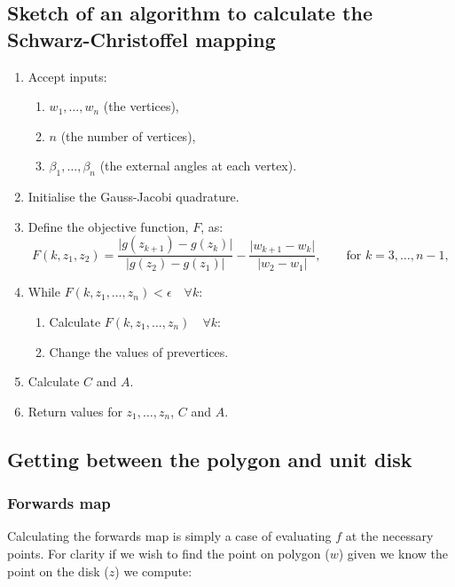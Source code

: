 \documentclass[a4paper,10pt]{amsart}
\newcommand{\sch}{Schwarz-Christoffel }
\begin{document}
\subsection{Sketch of an algorithm to calculate the \sch mapping}

\begin{enumerate}
\item Accept inputs:
   \begin{enumerate} 
      \item $w_1,\dots,w_n$ (the vertices),
      \item $n$ (the number of vertices),
      \item $\beta_1,\dots,\beta_n$ (the external angles at each vertex).
   \end{enumerate}
\item Initialise the Gauss-Jacobi quadrature.
\item Define the objective function, $F$, as:
 \begin{equation*}
 F(k,z_1,z_2) = \frac{\vert g(z_{k+1}) -  g(z_k) \vert}{\vert g(z_2)-g(z_1)\vert} - \frac{\vert w_{k+1} - w_k\vert}{\vert w_2 - w_1\vert}, \qquad \text{for } k=3,\dots,n-1,
 \end{equation*}
\item While $F(k,z_1,\dots,z_n) < \epsilon \quad \forall k$:
\begin{enumerate}
  \item Calculate $F(k,z_1,\dots,z_n) \quad \forall k$:
  \item Change the values of prevertices.
\end{enumerate}
\item Calculate $C$ and $A$.
\item Return values for $z_1,\dots,z_n$, $C$ and $A$.
\end{enumerate}



\subsection{Getting between the polygon and unit disk}

\subsubsection{Forwards map}

Calculating the forwards map is simply a case of evaluating $f$ at the necessary points. For clarity if we wish to find the point on polygon ($w$) given we know the point on the disk ($z$) we compute:
\end{document}
